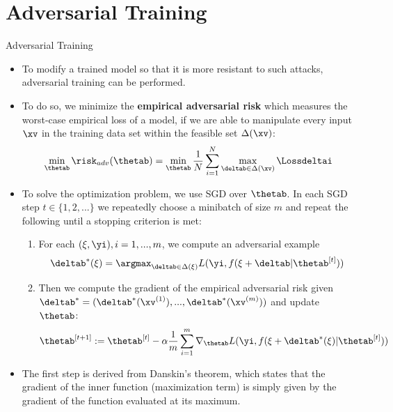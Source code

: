 \section{Adversarial  Training}
\begin{vbframe}{Adversarial Training}
    \begin{itemize}
        \item To modify a trained model so that it is more resistant to such attacks, adversarial training can be performed. 
        \lz
          \lz
        \item To do so, we minimize the \textbf{empirical adversarial risk} which measures the worst-case empirical loss of a model, if we are able to manipulate every input $\xv$ in the training data set within the feasible set $\Delta(\xv)$:
        \begin{equation*}
            \min_{\thetab} \risk_{adv}(\thetab) = \min_{\thetab} \frac{1}{N} \sum_{i = 1}^{N} \max_{\deltab \in \Delta(\xv)} \Lossdeltai
        \end{equation*}
          
          \framebreak
      
        \item To solve the optimization problem, we use SGD over $\thetab$. In each SGD step $t \in \{1, 2,...\}$ we repeatedly choose a minibatch of size $m$ and repeat the following until a stopping criterion is met: 
        \begin{enumerate}
            \item For each $(\xi, \yi), i = 1, ..., m$, we compute an adversarial example 
            \begin{equation*}
                \deltab^{*}(\xi) = \argmax_{\deltab \in \Delta(\xi)} L(\yi, f(\xi + \deltab| \thetab^{[t]}))
            \end{equation*}
            \item Then we compute the gradient of the empirical adversarial risk given $\deltab^* = (\deltab^*(\xv^{(1)}), ..., \deltab^*(\xv^{(m)}))$ and update $\thetab$: 
            \begin{equation*}
                \thetab^{[t+1]} := \thetab^{[t]} - \alpha \frac{1}{m} \sum_{i = 1}^{m} \nabla_{\thetab} L(\yi, f(\xi + \deltab^*(\xi)| \thetab^{[t]}))
            \end{equation*}
        \end{enumerate}
        \item The first step is derived from Danskin's theorem, which states that the gradient of the inner function (maximization term) is simply given by the gradient of the function evaluated at its maximum.
    \end{itemize}
\end{vbframe}

